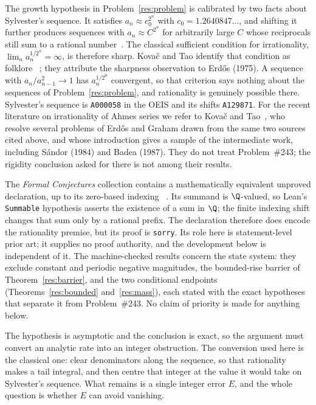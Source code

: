 The growth hypothesis in Problem~\ref{res:problem} is calibrated by two facts
about Sylvester's sequence.  It satisfies $a_n\approx c_0^{2^{n}}$ with
$c_0=1.2640847\ldots$, and shifting it further produces sequences with
$a_n\approx C^{2^{n}}$ for arbitrarily large $C$ whose reciprocals still sum
to a rational number~\cite[arXiv v4, p.~2]{kovactao2024}.  The classical sufficient
condition for irrationality, $\lim_n a_n^{1/2^{n}}=\infty$, is therefore
sharp.  Kova\v{c} and Tao identify that condition as folklore
~\cite[arXiv v4, p.~2]{kovactao2024}; they attribute the sharpness observation to
Erd\H{o}s (1975).  A sequence with
$a_n/a_{n-1}^{2}\to1$ has $a_n^{1/2^{n}}$
convergent, so that criterion says nothing about the sequences of
Problem~\ref{res:problem}, and rationality is genuinely possible there.
Sylvester's
sequence is \texttt{A000058} in the OEIS and its shifts \texttt{A129871}.  For
the recent literature on irrationality of Ahmes series we refer to Kova\v{c}
and Tao~\cite{kovactao2024}, who resolve several problems of Erd\H{o}s and
Graham drawn from the same two sources cited above, and whose introduction
gives a sample of the intermediate work, including S\'andor (1984) and Badea
(1987).  They do not treat Problem~\#243; the rigidity conclusion asked for
there is not among their results.

The \emph{Formal Conjectures} collection contains a mathematically equivalent
unproved declaration, up to its zero-based indexing
~\cite{formalconjectures243}.  Its summand is $\Q$-valued, so Lean's
\texttt{Summable} hypothesis asserts the existence of a sum in $\Q$; the
finite indexing shift changes that sum only by a rational prefix.  The
declaration therefore does encode the rationality premise, but its proof is
\texttt{sorry}.  Its role here is statement-level prior art; it supplies no
proof authority, and the development below is independent of it.
The machine-checked results concern the state system: they exclude constant and
periodic negative magnitudes, the bounded-rise barrier of
Theorem~\ref{res:barrier}, and the two conditional endpoints
(Theorems~\ref{res:bounded} and~\ref{res:mass}), each stated with the exact
hypotheses that separate it from Problem~\#243.  No claim of priority is made
for anything below.

The hypothesis is asymptotic and the conclusion is exact, so the argument must
convert an analytic rate into an integer obstruction.  The conversion used here
is the classical one: clear denominators along the sequence, so that
rationality makes a tail integral, and then centre that integer at the value it
would take on Sylvester's sequence.  What remains is a single integer error
$E$, and the whole question is whether $E$ can avoid vanishing.


